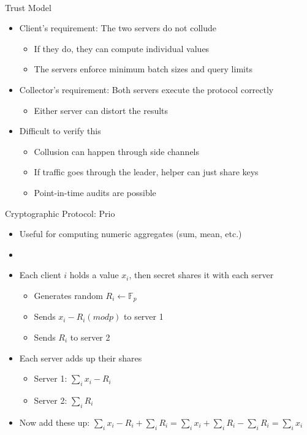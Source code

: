 \documentclass[helvetica]{beamer}
\begin{document}
\begin{frame}{Trust Model}

  \begin{itemize}
  \item Client's requirement: The two servers do not collude
    \begin{itemize}
    \item If they do, they can compute individual values
    \item The servers enforce minimum batch sizes and query limits      
    \end{itemize}

  \item Collector's requirement: Both servers execute the protocol correctly
    \begin{itemize}
    \item Either server can distort the results
    \end{itemize}

  \item Difficult to verify this
    \begin{itemize}
    \item Collusion can happen through side channels
    \item If traffic goes through the leader, helper can just share keys
    \item Point-in-time audits are possible
    \end{itemize}
  \end{itemize}

\end{frame}


\begin{frame}{Cryptographic Protocol: Prio~\cite{201553}}

  \begin{itemize}
  \item Useful for computing numeric aggregates (sum, mean, etc.)
  \item[]
  \item Each client $i$ holds a value $x_i$, then secret shares it with each server
    \begin{itemize}
    \item Generates random $R_i \leftarrow \mathbb{F}_p$
    \item Sends $x_i - R_i (mod p)$ to server 1
    \item Sends $R_i$ to server 2
    \end{itemize}

  \item Each server adds up their shares
    \begin{itemize}
    \item Server 1: $\sum_i x_i - R_i$
    \item Server 2: $\sum_i R_i$
    \end{itemize}

  \item Now add these up: $\sum_i x_i - R_i + \sum_i R_i = \sum_i x_i + \sum_i R_i - \sum_i R_i = \sum_i x_i$
  \end{itemize}
\end{frame}
\end{document}
